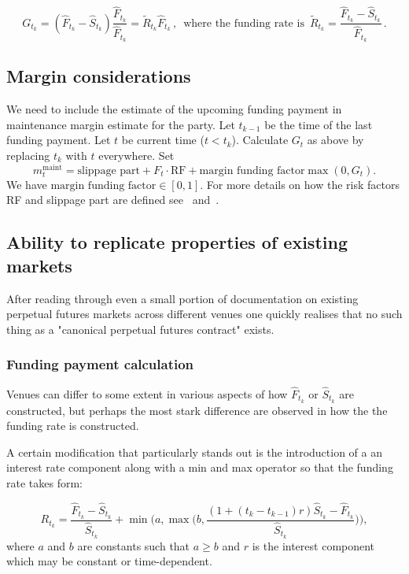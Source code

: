\documentclass[10pt]{article}
\begin{document}
\[
G_{t_k} = (\hat F_{t_k} - \hat S_{t_k})\frac{\hat F_{t_k}}{\hat F_{t_k}} = \tilde R_{t_k} \hat F_{t_k}\,,\,\,\,\text{where the funding rate is}\,\,\, \tilde R_{t_k} = \frac{\hat F_{t_k} - \hat S_{t_k}}{\hat F_{t_k}}\,.
\]


\subsection{Margin considerations}
\label{sec:funding_in_maintenance}
We need to include the estimate of the upcoming funding payment in maintenance margin estimate for the party. 
Let $t_{k-1}$ be the time of the last funding payment. Let $t$ be current time ($t<t_k$). 
Calculate $G_t$ as above by replacing $t_k$ with $t$ everywhere. 
Set 
\[
m^{\text{maint}}_t = \text{slippage part} + F_t \cdot \text{RF} + \text{margin funding factor}\max(0,G_t).    
\]
We have $\text{margin funding factor} \in [0,1]$.
For more details on how the risk factors RF and slippage part are defined see~\cite{margins paper} and~\cite{margins spec}.

\subsection{Ability to replicate properties of existing markets}

After reading through even a small portion of documentation on existing perpetual futures markets across different venues one quickly realises that no such thing as a "canonical perpetual futures contract" exists. 

\subsubsection{Funding payment calculation}
Venues can differ to some extent in various aspects of how $\hat F_{t_k}$ or $\hat S_{t_k}$ are constructed, but perhaps the most stark difference are observed in how the the funding rate is constructed.

A certain modification that particularly stands out is the introduction of a an interest rate component along with a min and max operator so that the funding rate takes form:

$$
R_{t_k} = \frac{\hat F_{t_k} - \hat S_{t_k}}{\hat S_{t_k}} + \min \Bigg (a,\max \bigg(b, \frac{(1+(t_k-t_{k-1})r)\hat S_{t_k} - \hat F_{t_k} }{\hat S_{t_k}} \bigg ) \Bigg ), 
$$
where $a$ and $b$ are constants such that $ a \ge b $ and $r$ is the interest component which may be constant or time-dependent.
\end{document}
